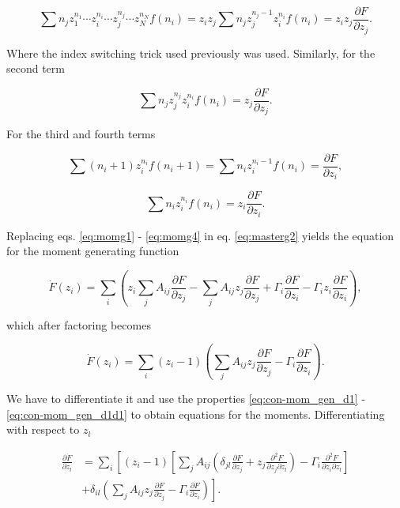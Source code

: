 \begin{equation}
  \label{eq:momg1}
  \sum n_j z_1^{n_1}\dotsm z_i^{n_i}\dotsm z_j^{n_j}\dotsm z_N^{n_N} f(n_i) = z_iz_j\sum n_jz_j^{n_j-1}z_i^{n_i}f(n_i) = z_iz_j\frac{\partial F}{\partial z_j}. 
\end{equation} 

Where the index switching trick used previously was used. Similarly, for the second term

\begin{equation}
  \label{eq:momg2}
  \sum n_jz_j^{n_j}z_i^{n_i}f(n_i) = z_j\frac{\partial F}{\partial z_j}.
\end{equation}

For the third and fourth terms

\begin{equation}
  \label{eq:momg3}
  \sum (n_i+1)z_i^{n_i}f(n_i+1) = \sum n_i z_i^{n_i-1}f(n_i) = \frac{\partial F}{\partial z_i},
\end{equation}

\begin{equation}
  \label{eq:momg4}
  \sum n_iz_i^{n_i}f(n_i) = z_i\frac{\partial F}{\partial z_i}.
\end{equation}

Replacing eqs. \eqref{eq:momg1} - \eqref{eq:momg4} in eq. \eqref{eq:masterg2} yields the equation for the moment generating function

\begin{equation}
\dot{F}(z_i) = \sum_i\left( z_i\sum_jA_{ij}\frac{\partial F}{\partial z_j} - \sum_jA_{ij} z_j \frac{\partial F}{\partial z_j} + \Gamma_i\frac{\partial F}{\partial z_i} - \Gamma_iz_i\frac{\partial F}{\partial z_i}\right),
\end{equation}

which after factoring becomes

\begin{equation}
\label{eq:momg}
\dot{F}(z_i) = \sum_i(z_i-1)\left(\sum_jA_{ij} z_j \frac{\partial F}{\partial z_j} - \Gamma_i\frac{\partial F}{\partial z_i}\right).
\end{equation}

We have to differentiate it and use the properties \eqref{eq:con-mom_gen_d1} - \eqref{eq:con-mom_gen_d1d1} to obtain equations for the moments. Differentiating with respect to $z_l$

\begin{equation*}
\begin{split}
\frac{\partial \dot{F}}{\partial z_l} &= \sum_i\left[(z_i-1)\left[\sum_jA_{ij}\left(\delta_{jl}\frac{\partial F}{\partial z_j}+z_j\frac{\partial^2 F}{\partial z_j\partial z_l}\right)-\Gamma_i\frac{\partial^2 F}{\partial z_i\partial z_l}\right]\right.\\
&+\left.\delta_{il}\left(\sum_jA_{ij}z_j\frac{\partial F}{\partial z_j}-\Gamma_i\frac{\partial F}{\partial z_i}\right)\right].
\end{split}
\end{equation*}

